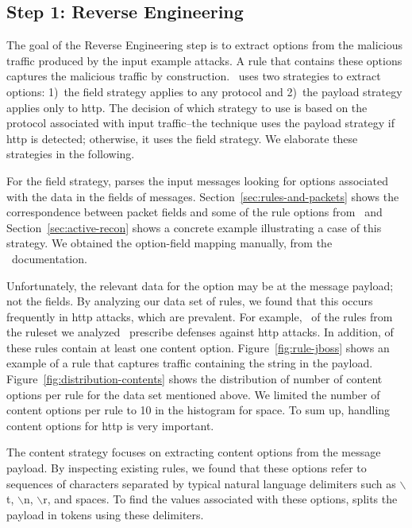 \documentclass[conference]{IEEEtran}
\begin{document}
\subsection{Step 1: Reverse Engineering}
\label{sec:reverse-engineering}

The goal of the Reverse Engineering step is to extract options from
the malicious traffic produced by the input example attacks. A rule
that contains these options captures the malicious traffic by
construction. \tname\ uses two strategies to extract options: 1)~the
field strategy applies to any protocol and 2)~the payload strategy
applies only to http.  The decision of which strategy to use is based
on the protocol associated with input traffic--the technique uses the
payload strategy if http is detected; otherwise, it uses the field
strategy. We elaborate these strategies in the following.

For the field strategy, \tname{} parses the input messages looking for
options associated with the data in the fields of
messages. Section~\ref{sec:rules-and-packets} shows the correspondence
between packet fields and some of the rule options from \suri\ and
Section~\ref{sec:active-recon} shows a concrete example illustrating a
case of this strategy. We obtained the option-field mapping
manually, from the \suri\ documentation.

Unfortunately, the relevant data for the option may be at the message
payload; not the fields. By analyzing our data set of rules, we found
that this occurs frequently in http attacks, which are prevalent. For
example, \percHttp\ of the \numrulessuri{} rules from the ruleset we
analyzed~\cite{emerging-threats-open} prescribe defenses against http
attacks. In addition, \percRulesWithContent{} of these rules contain
at least one content option. Figure~\ref{fig:rule-jboss} shows an
example of a rule that captures traffic containing the string
 in the payload.
Figure~\ref{fig:distribution-contents} shows the distribution of
number of content options per rule for the data set mentioned
above. We limited the number of content options per rule to 10 in the
histogram for space.   To sum up, handling content options for
http is very important.

The content strategy focuses on extracting content options from the
message payload. By inspecting existing rules, we found that these
options refer to sequences of characters separated by typical natural
language delimiters such as $\backslash$t, $\backslash$n,
$\backslash$r, and spaces. To find the values associated with these
options, \tname{} splits the payload in tokens using these delimiters.
\end{document}
